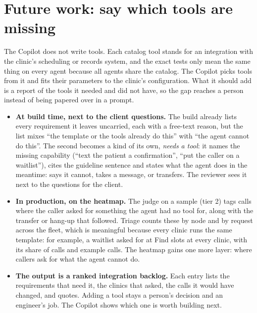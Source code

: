 \documentclass[11pt,a4paper]{article}
\begin{document}
\section{Future work: say which tools are missing}

The Copilot does not write tools. Each catalog tool stands for an integration with the clinic's scheduling or records system, and the exact tests only mean the same thing on every agent because all agents share the catalog. The Copilot picks tools from it and fits their parameters to the clinic's configuration. What it should add is a report of the tools it needed and did not have, so the gap reaches a person instead of being papered over in a prompt.
\begin{itemize}
  \item \textbf{At build time, next to the client questions.} The build already lists every requirement it leaves uncarried, each with a free-text reason, but the list mixes ``the template or the tools already do this'' with ``the agent cannot do this''. The second becomes a kind of its own, \emph{needs a tool}: it names the missing capability (``text the patient a confirmation'', ``put the caller on a waitlist''), cites the guideline sentence and states what the agent does in the meantime: says it cannot, takes a message, or transfers. The reviewer sees it next to the questions for the client.
  \item \textbf{In production, on the heatmap.} The judge on a sample (tier 2) tags calls where the caller asked for something the agent had no tool for, along with the transfer or hang-up that followed. Triage counts these by node and by request across the fleet, which is meaningful because every clinic runs the same template: for example, a waitlist asked for at Find slots at every clinic, with its share of calls and example calls. The heatmap gains one more layer: where callers ask for what the agent cannot do.
  \item \textbf{The output is a ranked integration backlog.} Each entry lists the requirements that need it, the clinics that asked, the calls it would have changed, and quotes. Adding a tool stays a person's decision and an engineer's job. The Copilot shows which one is worth building next.
\end{itemize}
\end{document}
